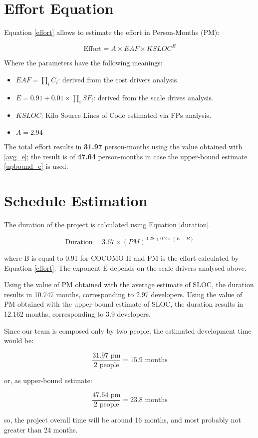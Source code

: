 \section{Effort Equation}
Equation \ref{effort} allows to estimate the effort in Person-Months (PM):

\begin{equation}
    \textrm{Effort} = A \times EAF \times KSLOC^E
    \label{effort}
\end{equation}

Where the parameters have the following meanings:
\begin{itemize}
    \item $EAF = \prod_i C_i$: derived from the cost drivers analysis.
    \item $E=0.91 + 0.01 \times \prod_{i}SF_i$: derived from the scale drives analysis.
    \item $KSLOC$: Kilo Source Lines of Code estimated via FPs analysis.
    \item $A=2.94$
\end{itemize}

The total effort results in \textbf{31.97} person-months using the value obtained with \ref{avg_e}; the result is of \textbf{47.64} person-months in case the upper-bound estimate \ref{upbound_e} is used.

\section{Schedule Estimation}
The duration of the project is calculated using Equation \ref{duration}.

\begin{equation}
    \textrm{Duration} = 3.67 \times (PM)^{0.28+0.2 \times (E-B)}
    \label{duration}
\end{equation}

\noindent
where B is equal to 0.91 for COCOMO II and PM is the effort calculated by Equation \ref{effort}. The exponent E depends on the scale drivers analysed above.

Using the value of PM obtained with the average estimate of SLOC, the duration results in 10.747 months, corresponding to 2.97 developers.
\noindent
Using the value of PM obtained with the upper-bound estimate of SLOC, the duration results in 12.162 months, corresponding to 3.9 developers.

Since our team is composed only by two people, the estimated development time would be:

\[\frac{31.97\textrm{ pm}}{2 \textrm{ people}}=15.9\textrm{ months}\]

\noindent
or, as upper-bound estimate:

\[\frac{47.64\textrm{ pm}}{2 \textrm{ people}}=23.8\textrm{ months}\]

\noindent
so, the project overall time will be around 16 months, and most probably not greater than 24 months.